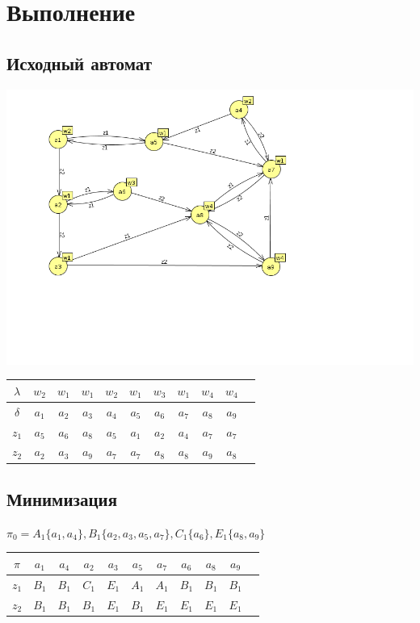 \section{Выполнение}
\subsection{Исходный автомат}
\includegraphics[width=400bp]{img/first.png}

\begin{table}[!h]
\begin{tabular}{|c|c|c|c|c|c|c|c|c|c|c|}
\hline
$\lambda$ & $w_2$ & $w_1$ & $w_1$ & $w_2$ & $w_1$ & $w_3$ & $w_1$ & $w_4$ & $w_4$ \\ \hline
$\delta$  & $a_1$ & $a_2$ & $a_3$ & $a_4$ & $a_5$ & $a_6$ & $a_7$ & $a_8$ & $a_9$ \\ \hline
$z_1$     & $a_5$ & $a_6$ & $a_8$ & $a_5$ & $a_1$ & $a_2$ & $a_4$ & $a_7$ & $a_7$ \\ \hline
$z_2$     & $a_2$ & $a_3$ & $a_9$ & $a_7$ & $a_7$ & $a_8$ & $a_8$ & $a_9$ & $a_8$ \\ \hline
\end{tabular}
\end{table}
\subsection{Минимизация}

$\pi_0 = A_1 \{a_1, a_4\}, B_1 \{a_2, a_3, a_5, a_7\}, C_1 \{a_6\}, E_1 \{a_8, a_9\}$

\begin{table}[!h]
\begin{tabular}{|c|c|c|c|c|c|c|c|c|c|c|}
\hline
$\pi$     & $a_1$ & $a_4$ & $a_2$ & $a_3$ & $a_5$ & $a_7$ & $a_6$ & $a_8$ & $a_9$ \\ \hline
$z_1$     & $B_1$ & $B_1$ & $C_1$ & $E_1$ & $A_1$ & $A_1$ & $B_1$ & $B_1$ & $B_1$ \\ \hline
$z_2$     & $B_1$ & $B_1$ & $B_1$ & $E_1$ & $B_1$ & $E_1$ & $E_1$ & $E_1$ & $E_1$ \\ \hline
\end{tabular}
\end{table}

